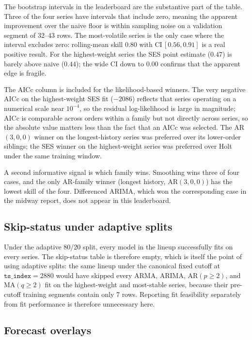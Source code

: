 The bootstrap intervals in the leaderboard are the substantive part of the table. Three of the four series have intervals that include zero, meaning the apparent improvement over the naive floor is within sampling noise on a validation segment of 32--43 rows. The most-volatile series is the only case where the interval excludes zero: rolling-mean skill $0.80$ with $\mathrm{CI}\,[0.56, 0.91]$ is a real positive result. For the highest-weight series the SES point estimate ($0.47$) is barely above naive ($0.44$); the wide CI down to $0.00$ confirms that the apparent edge is fragile.

The AICc column is included for the likelihood-based winners. The very negative AICc on the highest-weight SES fit ($-2086$) reflects that series operating on a numerical scale near $10^{-4}$, so the residual log-likelihood is large in magnitude; AICc is comparable across orders within a family but not directly across series, so the absolute value matters less than the fact that an AICc was selected. The AR$(3,0,0)$ winner on the longest-history series was preferred over its lower-order siblings; the SES winner on the highest-weight series was preferred over Holt under the same training window.

A second informative signal is which family wins. Smoothing wins three of four cases, and the only AR-family winner (longest history, AR$(3,0,0)$) has the lowest skill of the four. Differenced ARIMA, which won the corresponding case in the midway report, does not appear in this leaderboard.

\subsection{Skip-status under adaptive splits}
\label{sec:classical:skip}

Under the adaptive 80/20 split, every model in the lineup successfully fits on every series. The skip-status table is therefore empty, which is itself the point of using adaptive splits: the same lineup under the canonical fixed cutoff at $\mathtt{ts\_index} = 2880$ would have skipped every ARMA, ARIMA, AR$(p \ge 2)$, and MA$(q \ge 2)$ fit on the highest-weight and most-stable series, because their pre-cutoff training segments contain only 7 rows. Reporting fit feasibility separately from fit performance is therefore unnecessary here.

\subsection{Forecast overlays}
\label{sec:classical:overlay}

